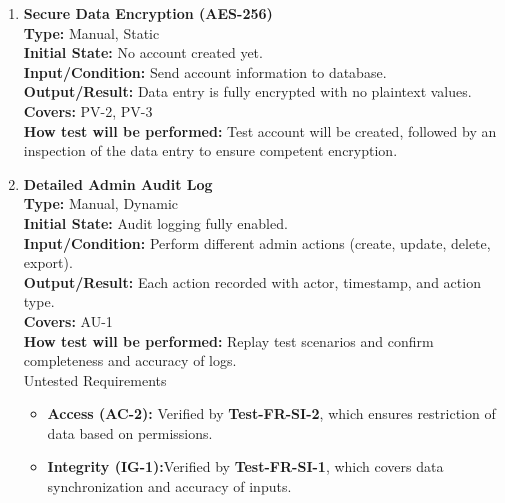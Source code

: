 \documentclass[12pt, titlepage]{article}
\begin{document}
\begin{enumerate}[label=\bfseries ST-\arabic*:, wide=0pt]
  \item \label{test-ST4} \textbf{Secure Data Encryption (AES-256)}\\[2mm]
    {\bf Type:} Manual, Static\\
    {\bf Initial State:} No account created yet.\\
    {\bf Input/Condition:} Send account information to database.\\
    {\bf Output/Result:} Data entry is fully encrypted with no plaintext values.\\
    {\bf Covers:} PV-2, PV-3\\
    {\bf How test will be performed:} Test account will be created, followed by an inspection of the data entry to ensure competent encryption.\\

  \item \label{test-ST5} \textbf{Detailed Admin Audit Log}\\[2mm]
    {\bf Type:} Manual, Dynamic\\
    {\bf Initial State:} Audit logging fully enabled.\\
    {\bf Input/Condition:} Perform different admin actions (create, update, delete, export).\\
    {\bf Output/Result:} Each action recorded with actor, timestamp, and action type.\\
    {\bf Covers:} AU-1\\
    {\bf How test will be performed:} Replay test scenarios and confirm completeness and accuracy of logs.\\

{Untested Requirements}
\begin{itemize}
    \item \textbf{Access (AC-2):} Verified by \textbf{Test-FR-SI-2}, which ensures restriction of data based on permissions.

    \item \textbf{Integrity (IG-1):}Verified by \textbf{Test-FR-SI-1}, which covers data synchronization and accuracy of inputs.
\end{itemize}

\end{enumerate}
\end{document}
